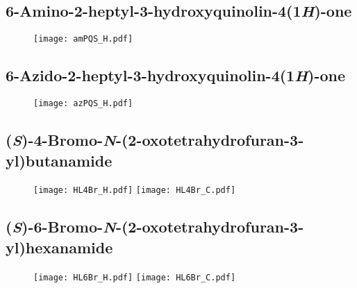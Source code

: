 \subsection{6-Amino-2-heptyl-3-hydroxyquinolin-4(1\textit{H})-one }

\begin{figure}[H]
	\centering
		\texttt{[image: amPQS\_H.pdf]}
\end{figure}

\subsection{6-Azido-2-heptyl-3-hydroxyquinolin-4(1\textit{H})-one }

\begin{figure}[H]
	\centering
		\texttt{[image: azPQS\_H.pdf]}
\end{figure}

\subsection{(\textit{S})-4-Bromo-\textit{N}-(2-oxotetrahydrofuran-3-yl)butanamide }

\begin{figure}[H]
	\centering
		\texttt{[image: HL4Br\_H.pdf]}
		\texttt{[image: HL4Br\_C.pdf]}
\end{figure}

\subsection{(\textit{S})-6-Bromo-\textit{N}-(2-oxotetrahydrofuran-3-yl)hexanamide }

\begin{figure}[H]
	\centering
		\texttt{[image: HL6Br\_H.pdf]}
		\texttt{[image: HL6Br\_C.pdf]}
\end{figure}

